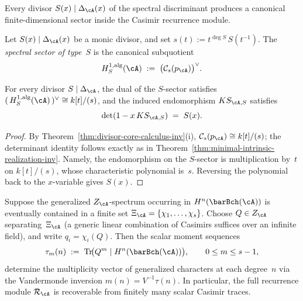 Every divisor $S(x) \mid \Delta_\cA(x)$ of the spectral
discriminant produces a canonical finite-dimensional sector
inside the Casimir recurrence module.

\begin{definition}
\label{def:reduced-spectral-sector}
Let $S(x) \mid \Delta_\cA(x)$ be a monic divisor, and set
$s(t) := t^{\deg S}\,S(t^{-1})$. The \emph{spectral sector
of type~$S$} is the canonical subquotient
\[
H^{1,\mathrm{alg}}_S(\cA)
 \;:=\;
 \bigl(\mathcal{C}_s(p_\cA)\bigr)^\vee.
\]
\end{definition}

\begin{theorem}
\label{thm:sector-determinant-inv}
For every divisor $S \mid \Delta_\cA$, the dual of the
$S$-sector satisfies
$(\,H^{1,\mathrm{alg}}_S(\cA)\,)^\vee
 \cong k[t]/(s)$,
and the induced endomorphism $KS_{\cA,S}$ satisfies
\[
\det(1 - x\,KS_{\cA,S}) \;=\; S(x).
\]
\end{theorem}

\begin{proof}
By Theorem~\ref{thm:divisor-core-calculus-inv}(i),
$\mathcal{C}_s(p_\cA) \cong k[t]/(s)$; the determinant
identity follows exactly as in
Theorem~\ref{thm:minimal-intrinsic-realization-inv}.
Namely, the endomorphism on the $S$-sector is multiplication by~$t$ on
$k[t]/(s)$, whose characteristic polynomial is~$s$.
Reversing the polynomial back to the $x$-variable gives $S(x)$.
\end{proof}

\begin{theorem}
\label{thm:casimir-moment-reconstruction-inv}
Suppose the generalized $Z_\cA$-spectrum occurring in
$H^n(\barBch(\cA))$ is eventually contained in a finite set
$\Xi_\cA = \{\chi_1,\ldots,\chi_s\}$. Choose
$Q \in Z_\cA$ separating~$\Xi_\cA$ \textup{(}a generic
linear combination of Casimirs suffices over an infinite
field\textup{)}, and write $q_i = \chi_i(Q)$. Then the
scalar moment sequences
\[
\tau_m(n) \;:=\;
 \operatorname{Tr}\!\bigl(
 Q^m \mid H^n(\barBch(\cA))
 \bigr),
\qquad 0 \leq m \leq s-1,
\]
determine the multiplicity vector of generalized characters
at each degree~$n$ via the Vandermonde inversion
$m(n) = V^{-1}\tau(n)$. In particular, the full recurrence
module $\mathcal{R}_\cA$ is recoverable from finitely many
scalar Casimir traces.
\end{theorem}

